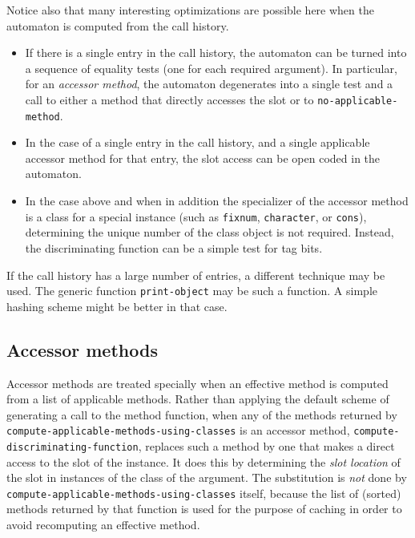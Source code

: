 Notice also that many interesting optimizations are possible here when
the automaton is computed from the call history.

\begin{itemize}
\item If there is a single entry in the call history, the automaton
  can be turned into a sequence of equality tests (one for each
  required argument).  In particular, for an \emph{accessor method},
  the automaton degenerates into a single test and a call to either
  a method that directly accesses the slot or to
  \texttt{no-applicable-method}. 
\item In the case of a single entry in the call history, and a single
  applicable accessor method for that entry, the slot access can be
  open coded in the automaton. 
\item In the case above and when in addition the specializer of the
  accessor method is a class for a special instance (such as
  \texttt{fixnum}, \texttt{character}, or \texttt{cons}), determining
  the unique number of the class object is not required.  Instead, the
  discriminating function can be a simple test for tag bits.
\end{itemize}

If the call history has a large number of entries, a different technique
may be used.  The generic function \texttt{print-object} may be such a
function.  A simple hashing scheme might be better in that case.

\subsection{Accessor methods}
\label{sec-generic-function-dispatch-accessor-methods}

Accessor methods are treated specially when an effective method is
computed from a list of applicable methods.  Rather than applying the
default scheme of generating a call to the method function, when any
of the methods returned by
\texttt{compute-applicable-methods-using-classes} is an accessor
method, \texttt{compute-discriminating-function}, replaces such a
method by one that makes a direct access to the slot of the instance.
It does this by determining the \emph{slot location} of the slot in
instances of the class of the argument.  The substitution is
\emph{not} done by \texttt{compute-applicable-methods-using-classes}
itself, because the list of (sorted) methods returned by that function
is used for the purpose of caching in order to avoid recomputing an
effective method. 

